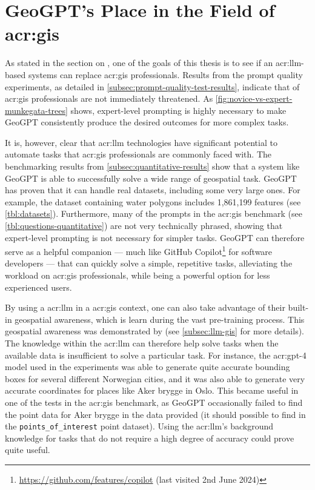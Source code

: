 \section[GeoGPT's Place in the Field of GIS]{GeoGPT's Place in the Field of \acrshort{acr:gis}}
\label{sec:geogpt-in-gis}

As stated in the section on , one of the goals of this thesis is to see if an \acrshort{acr:llm}-based systems can replace \acrshort{acr:gis} professionals. Results from the prompt quality experiments, as detailed in \autoref{subsec:prompt-quality-test-results}, indicate that of \acrshort{acr:gis} professionals are not immediately threatened. As \autoref{fig:novice-vs-expert-munkegata-trees} shows, expert-level prompting is highly necessary to make GeoGPT consistently produce the desired outcomes for more complex tasks.

It is, however, clear that \acrshort{acr:llm} technologies have significant potential to automate tasks that \acrshort{acr:gis} professionals are commonly faced with. The benchmarking results from \autoref{subsec:quantitative-results} show that a system like GeoGPT is able to successfully solve a wide range of geospatial task. GeoGPT has proven that it can handle real datasets, including some very large ones. For example, the dataset containing water polygons includes 1,861,199 features (see \autoref{tbl:datasets}). Furthermore, many of the prompts in the \acrshort{acr:gis} benchmark (see \autoref{tbl:questions-quantitative}) are not very technically phrased, showing that expert-level prompting is not necessary for simpler tasks. GeoGPT can therefore serve as a helpful companion --- much like GitHub Copilot\footnote{\url{https://github.com/features/copilot} (last visited 2nd June 2024)} for software developers --- that can quickly solve a simple, repetitive tasks, alleviating the workload on \acrshort{acr:gis} professionals, while being a powerful option for less experienced users.

By using a \acrlong{acr:llm} in a \acrshort{acr:gis} context, one can also take advantage of their built-in geospatial awareness, which is learn during the vast pre-training process. This geospatial awareness was demonstrated by \cite{robertsGPT4GEOHowLanguage2023} (see \autoref{subsec:llm-gis} for more details). The knowledge within the \acrshort{acr:llm} can therefore help solve tasks when the available data is insufficient to solve a particular task. For instance, the \acrshort{acr:gpt}-4 model used in the experiments was able to generate quite accurate bounding boxes for several different Norwegian cities, and it was also able to generate very accurate coordinates for places like Aker brygge in Oslo. This became useful in one of the tests in the \acrshort{acr:gis} benchmark, as GeoGPT occasionally failed to find the point data for Aker brygge in the data provided (it should possible to find in the \texttt{points\_of\_interest} point dataset). Using the \acrshort{acr:llm}'s background knowledge for tasks that do not require a high degree of accuracy could prove quite useful.

